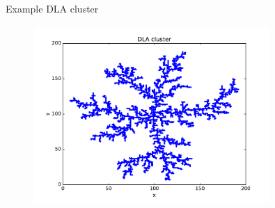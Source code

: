 \documentclass{beamer}
\begin{document}
\begin{frame}{Example DLA cluster}

\begin{figure}[H]
	\centering
	\includegraphics[width=0.8\textwidth]{dla.pdf}
\end{figure}

\end{frame}
\end{document}
